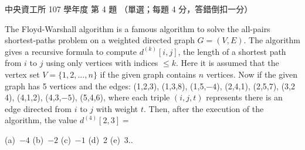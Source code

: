 \begin{pastexam}[label={px:ncu-107-dsa-04}]{中央資工所 107 學年度 第 4 題}
（單選；每題 4 分，答錯倒扣一分）

The Floyd-Warshall algorithm is a famous algorithm to solve the all-pairs shortest-paths problem
on a weighted directed graph $G=(V,E)$. The algorithm gives a recursive formula to compute
$d^{(k)}[i,j]$, the length of a shortest path from $i$ to $j$ using only vertices with indices
$\le k$. Here it is assumed that the vertex set $V=\{1,2,\ldots,n\}$ if the given graph contains
$n$ vertices. Now if the given graph has 5 vertices and the edges: (1,2,3), (1,3,8), (1,5,$-4$),
(2,4,1), (2,5,7), (3,2 4), (4,1,2), (4,3,$-5$), (5,4,6), where each triple $(i,j,t)$ represents
there is an edge directed from $i$ to $j$ with weight $t$. Then, after the execution of the
algorithm, the value $d^{(4)}[2,3]=$

(a)~$-4$ \qquad (b)~$-2$ \qquad (c)~$-1$ \qquad (d)~2 \qquad (e)~3..
\end{pastexam}

